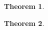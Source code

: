 \documentclass{article}
\newtheorem{theo}{Theorem}
\newenvironment{ftheo}
  {\begin{mdframed}\begin{theo}}
  {\end{theo}\end{mdframed}}
\begin{document}
\begin{ftheo}
\lipsum*[1]
\end{ftheo}

\begin{theo}
\lipsum*[1]
\end{theo}
\end{document}
